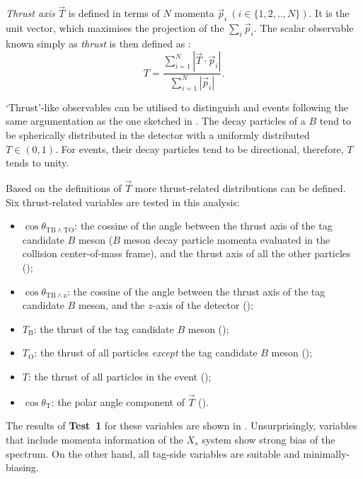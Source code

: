 \textit{Thrust axis} $\vec{T}$ is defined in terms of $N$ momenta $\vec{p}_i~(i\in\{1,2,..,N\})$.
It is the unit vector, which maximises the projection of the $\sum_i\vec{p}_i$.
The scalar observable known simply as \textit{thrust} is then defined as \cite{BaBar:2014omp}:
\begin{equation}\label{eq:thrust}
    T = \frac{\sum^N_{i=1}|\vec{T}\cdot\vec{p}_i|}{\sum^N_{i=1}|\vec{p}_i|}.
\end{equation}

`Thrust'-like observables can be utilised to distinguish \epem\ra\qqbar and \BtoXsgamma events following the same argumentation as the one sketched in .
The decay particles of a $B$ tend to be spherically distributed in the detector with a uniformly distributed $T\in(0,1)$.
For \qqbar events, their decay particles tend to be directional, therefore, $T$ tends to unity.

Based on the definitions of $\vec{T}$ more thrust-related distributions can be defined.
Six thrust-related variables are tested in this analysis:
\begin{itemize}
    \item $\cos\theta_{\mathrm{TB}\wedge\mathrm{TO}}$: the cossine of the angle between the thrust axis of the tag candidate $B$ meson ($B$ meson decay particle momenta evaluated in the collision center-of-mass frame),
    and the thrust axis of all the other particles ();
    \item $\cos\theta_{\mathrm{TB}\wedge\mathrm{z}}$: the cossine of the angle between the thrust axis of the tag candidate $B$ meson,
    and the $z$-axis of the detector ();
    \item $T_{\mathrm{B}}$: the thrust of the tag candidate $B$ meson ();
    \item $T_{\mathrm{O}}$: the thrust of all particles \textit{except} the tag candidate $B$ meson ();
    \item $T$: the thrust of all particles in the event ();
    \item $\cos\theta_{\mathrm{T}}$: the polar angle component of $\vec{T}$ ().
\end{itemize}

The results of \textbf{Test~1} for these variables are shown in .
Unsurprisingly, variables that include momenta information of the $X_s$ system show strong bias of the \EB spectrum.
On the other hand, all tag-side variables are suitable and minimally-biasing.


